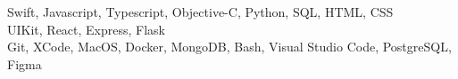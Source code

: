    Swift, Javascript, Typescript, Objective-C, Python, SQL, HTML, CSS \\
   UIKit, React, Express, Flask\\
  Git, XCode, MacOS, Docker, MongoDB, Bash, Visual Studio Code, PostgreSQL, Figma
